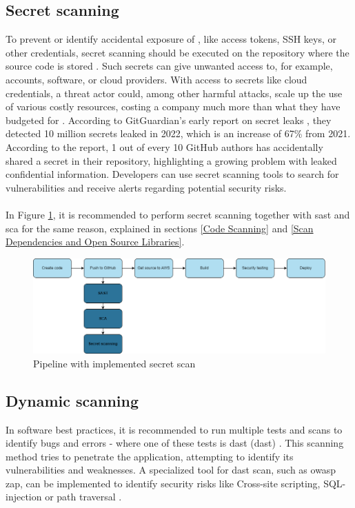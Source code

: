 \subsection{Secret scanning}
\label{Secret scanning}
To prevent or identify accidental exposure of , like access tokens, SSH keys, or other credentials, secret scanning should be executed on the repository where the source code is stored \cite{GithubSecretScanning}. Such secrets can give unwanted access to, for example, accounts, software, or cloud providers. With access to secrets like cloud credentials, a threat actor could, among other harmful attacks, scale up the use of various costly resources, costing a company much more than what they have budgeted for \cite{GitGuardianexploitexample}. According to GitGuardian's early report on secret leaks \cite{GitGuardiansecretsprawl}, they detected 10 million secrets leaked in 2022, which is an increase of 67\% from 2021. According to the report, 1 out of every 10 GitHub authors has accidentally shared a secret in their repository, highlighting a growing problem with leaked confidential information. Developers can use secret scanning tools to search for vulnerabilities and receive alerts regarding potential security risks. 
\\~\\
In Figure \ref{fig: Pipeline with implemented secret scan}, it is recommended to perform secret scanning together with \acrshort{sast} and \acrshort{sca} for the same reason, explained in sections \ref{Code Scanning} and \ref{Scan Dependencies and Open Source Libraries}.

\vspace{2mm}
\begin{figure}[H]
    \centering
    \includegraphics[width=0.8\columnwidth]{Images/pipeline4.png}
    \caption{Pipeline with implemented secret scan}
    \label{fig: Pipeline with implemented secret scan}
\end{figure}

\subsection{Dynamic scanning}
In software best practices, it is recommended to run multiple tests and scans to identify bugs and errors - where one of these tests is \acrlong{dast} (\acrshort{dast}) \cite{bestpracticeSupplyChain}. This scanning method tries to penetrate the application, attempting to identify its vulnerabilities and weaknesses. A specialized tool for \acrshort{dast} scan, such as \acrshort{owasp} \acrshort{zap}, can be implemented to identify security risks like
\gls{Cross-site scripting}, \gls{SQL-injection} or path traversal \cite{dynamictesting}.


